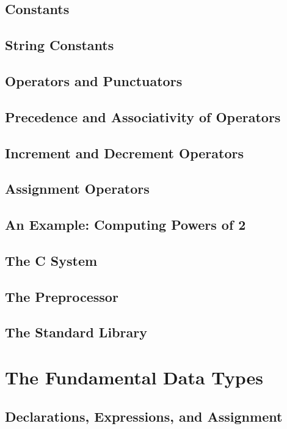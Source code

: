 \documentclass[12pt]{book}
\begin{document}
\section{Constants} \label{sec:constants}
\section{String Constants} \label{sec:string_constants}
\section{Operators and Punctuators} \label{sec:operators_punctuators}
\section{Precedence and Associativity of Operators} \label{sec:precedence_associativity}
\section{Increment and Decrement Operators} \label{sec:increment_decrement_operators}
\section{Assignment Operators} \label{sec:assignment_operators}
\section{An Example: Computing Powers of 2} \label{sec:computing_powers_of_2}
\section{The C System} \label{sec:c_system}
\section{The Preprocessor} \label{sec:preprocessor}
\section{The Standard Library} \label{sec:standard_library}

\chapter{The Fundamental Data Types}

\section{Declarations, Expressions, and Assignment} \label{sec:declarations_expressions_assignment}
\end{document}
